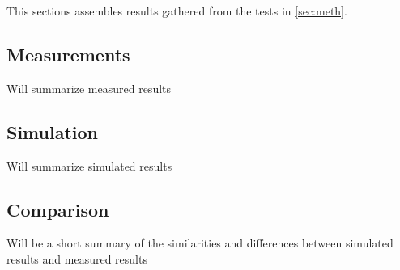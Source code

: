This sections assembles results gathered from the tests in \autoref{sec:meth}.

\subsection{Measurements}
Will summarize measured results

\subsection{Simulation}
Will summarize simulated results

\subsection{Comparison}\label{sec:res:comp}
Will be a short summary of the similarities and differences between simulated results and measured results